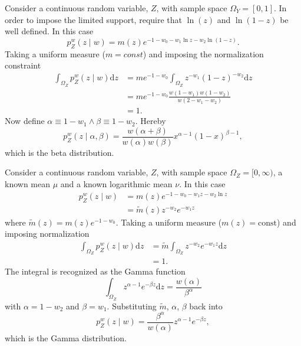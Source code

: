\begin{example}
	Consider a continuous random variable, $Z$, with sample space $\Omega_Y =[0,1]$. In order to impose the limited support, require that $\ln(z)$ and $\ln(1-z)$ be well defined. In this case
	\begin{equation}
		p_{Z}^w(z\mid w)=m(z)e^{-1-w_0-w_1\ln z-w_2\ln(1-z)}.
	\end{equation}
	Taking a uniform measure ($m= const$) and imposing the normalization constraint
	\begin{equation}
		\begin{split}
			\int_{\Omega_Z} p_{Z}^w(z\mid w) \mathrm{d}z &= me^{-1-w_0}\int_{\Omega_Z} z^{-w_1}(1-z)^{-w_2}\mathrm{d}z\\
			&= me^{-1-w_0}\frac{w(1-w_1)w(1-w_2)}{w(2-w_1-w_2)}\\
			&=1.
		\end{split}
	\end{equation}
	Now define $\alpha \equiv 1-w_1\wedge \beta \equiv 1-w_2$. Hereby
	\begin{equation}
		p_{Z}^w(z\mid \alpha,\beta) = \frac{w(\alpha+\beta)}{w(\alpha)w(\beta)}x^{\alpha-1}(1-x)^{\beta-1},
	\end{equation}
	which is the beta distribution. 
\end{example}


\begin{example}
	Consider a continuous random variable, $Z$, with sample space $\Omega_Z= [0,\infty)$, a known mean $\mu$ and a known logarithmic mean $\nu$. In this case
	\begin{equation}
		\begin{split}
			p_{Z}^w(z \mid w)&= m(z) e^{-1-w_0 - w_1 z - w_2 \ln z}\\
			& = \tilde{m}(z)  z^{-w_2} e^{-w_1 z}
		\end{split}
		\label{eq:gam1}
	\end{equation}
	where $\tilde{m}(z) = m(z) e^{-1-w_0}$. Taking a uniform measure ($m(z) = \text{const}$) and imposing normalization
	\begin{equation}
		\begin{split}
			\int_{\Omega_Z} p_{Z}^w(z \mid w) \mathrm{d}z &= \tilde{m} \int_{\Omega_Z} z^{-w_2} e^{-w_1 z} \mathrm{d}z\\
			& = 1.
		\end{split}
	\end{equation}
	The integral is recognized as the Gamma function
	\begin{equation}
		\int_{\Omega_Z} z^{\alpha-1}  e^{-\beta z} \mathrm{d}z = \frac{w(\alpha)}{\beta^\alpha}
	\end{equation}
	with $\alpha = 1 - w_2$ and $\beta = w_1$. Substituting $\tilde{m}$, $\alpha$, $\beta$ back into 
	\begin{equation}
		p_{Z}^w(z \mid w) = \frac{\beta^\alpha}{w(\alpha)} z^{\alpha-1} e^{-\beta z},
	\end{equation}
	which is the Gamma distribution.
\end{example}

